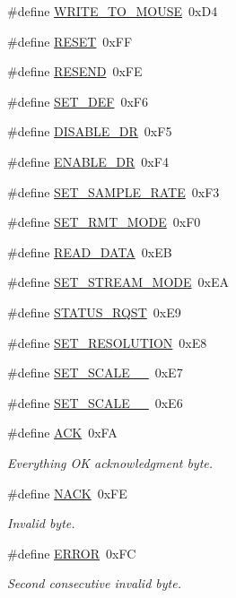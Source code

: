 \begin{DoxyCompactItemize}
\item 
\#define \hyperlink{group__Mouse_gafa9a46730bdfc6bfc06a0f69ae748f5a}{W\+R\+I\+T\+E\+\_\+\+T\+O\+\_\+\+M\+O\+U\+SE}~0x\+D4
\item 
\#define \hyperlink{group__Mouse_gab702106cf3b3e96750b6845ded4e0299}{R\+E\+S\+ET}~0x\+FF
\item 
\#define \hyperlink{group__Mouse_ga92f67631ef5a97e4a266c15bc710776d}{R\+E\+S\+E\+ND}~0x\+FE
\item 
\#define \hyperlink{group__Mouse_ga71d27263ec729975a65b52a01dddfc4a}{S\+E\+T\+\_\+\+D\+EF}~0x\+F6
\item 
\#define \hyperlink{group__Mouse_ga99114a41bdfc03944543c5b4bca62729}{D\+I\+S\+A\+B\+L\+E\+\_\+\+DR}~0x\+F5
\item 
\#define \hyperlink{group__Mouse_ga2b3a7d772b91d26441fe9a58cf0a67f3}{E\+N\+A\+B\+L\+E\+\_\+\+DR}~0x\+F4
\item 
\#define \hyperlink{group__Mouse_ga7f57224ffb2b6d5adfc1e4cb0118c7f9}{S\+E\+T\+\_\+\+S\+A\+M\+P\+L\+E\+\_\+\+R\+A\+TE}~0x\+F3
\item 
\#define \hyperlink{group__Mouse_ga31790efabdfef9c8d4bbeeb3e2f654cf}{S\+E\+T\+\_\+\+R\+M\+T\+\_\+\+M\+O\+DE}~0x\+F0
\item 
\#define \hyperlink{group__Mouse_ga8d406d5aff787991429e62cfd9bac721}{R\+E\+A\+D\+\_\+\+D\+A\+TA}~0x\+EB
\item 
\#define \hyperlink{group__Mouse_gaabf49b4a4d8ad72d202c8a7197058e35}{S\+E\+T\+\_\+\+S\+T\+R\+E\+A\+M\+\_\+\+M\+O\+DE}~0x\+EA
\item 
\#define \hyperlink{group__Mouse_ga21446eb13d0586c4030881708b6e7303}{S\+T\+A\+T\+U\+S\+\_\+\+R\+Q\+ST}~0x\+E9
\item 
\#define \hyperlink{group__Mouse_ga34d57709215034b82f6887fec2af1b02}{S\+E\+T\+\_\+\+R\+E\+S\+O\+L\+U\+T\+I\+ON}~0x\+E8
\item 
\#define \hyperlink{group__Mouse_gaae80e812686db70da7cfc0f14c37b541}{S\+E\+T\+\_\+\+S\+C\+A\+L\+E\+\_\+\_}~0x\+E7
\item 
\#define \hyperlink{group__Mouse_ga83080dfaa3e7cfe6a8e578fa6cee0171}{S\+E\+T\+\_\+\+S\+C\+A\+L\+E\+\_\+\_}~0x\+E6
\item 
\#define \hyperlink{group__Mouse_ga6f6489887e08bff4887d0bc5dcf214d8}{A\+CK}~0x\+FA
\begin{DoxyCompactList}\small\item\em Everything OK acknowledgment byte. \end{DoxyCompactList}\item 
\#define \hyperlink{group__Mouse_ga958518a45b12053ae33606ee7cb68a55}{N\+A\+CK}~0x\+FE
\begin{DoxyCompactList}\small\item\em Invalid byte. \end{DoxyCompactList}\item 
\#define \hyperlink{group__Mouse_ga8fe83ac76edc595f6b98cd4a4127aed5}{E\+R\+R\+OR}~0x\+FC
\begin{DoxyCompactList}\small\item\em Second consecutive invalid byte. \end{DoxyCompactList}\end{DoxyCompactItemize}


